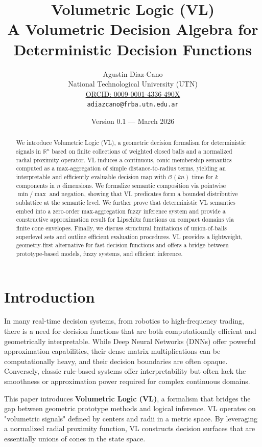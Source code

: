 \documentclass[11pt]{article}
\title{\textbf{Volumetric Logic (VL)}\\A Volumetric Decision Algebra for Deterministic Decision Functions}
\author{
Agustin Diaz-Cano\\[4pt]
National Technological University (UTN)\\[6pt]
\href{https://orcid.org/0009-0001-4336-490X}{ORCID: 0009-0001-4336-490X}\\[2pt]
\texttt{adiazcano@frba.utn.edu.ar}
}
\date{Version 0.1 --- March 2026}
\begin{document}
\maketitle

\begin{abstract}
We introduce Volumetric Logic (VL), a geometric decision formalism for deterministic signals in $\mathbb{R}^n$ based on finite collections of weighted closed balls and a normalized radial proximity operator. VL induces a continuous, conic membership semantics computed as a max-aggregation of simple distance-to-radius terms, yielding an interpretable and efficiently evaluable decision map with $\mathcal{O}(kn)$ time for $k$ components in $n$ dimensions. We formalize semantic composition via pointwise $\min/\max$ and negation, showing that VL predicates form a bounded distributive sublattice at the semantic level. We further prove that deterministic VL semantics embed into a zero-order max-aggregation fuzzy inference system and provide a constructive approximation result for Lipschitz functions on compact domains via finite cone envelopes. Finally, we discuss structural limitations of union-of-balls superlevel sets and outline efficient evaluation procedures. VL provides a lightweight, geometry-first alternative for fast decision functions and offers a bridge between prototype-based models, fuzzy systems, and efficient inference.
\end{abstract}

\section{Introduction}

In many real-time decision systems, from robotics to high-frequency trading, there is a need for decision functions that are both computationally efficient and geometrically interpretable. While Deep Neural Networks (DNNs) offer powerful approximation capabilities, their dense matrix multiplications can be computationally heavy, and their decision boundaries are often opaque. Conversely, classic rule-based systems offer interpretability but often lack the smoothness or approximation power required for complex continuous domains.

This paper introduces \textbf{Volumetric Logic (VL)}, a formalism that bridges the gap between geometric prototype methods and logical inference. VL operates on "volumetric signals" defined by centers and radii in a metric space. By leveraging a normalized radial proximity function, VL constructs decision surfaces that are essentially unions of cones in the state space.
\end{document}
